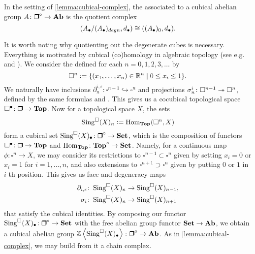 \begin{definition}
  \label{dfn:reduced-cubical-complex}
  In the setting of \ref{lemma:cubical-complex}, the
   associated to a cubical abelian group
  $A\colon \bsquare^\circ \to \categ{Ab}$ is the quotient complex
  $$(A_\bullet / (A_\bullet)_{degn}, d_\bullet) \cong ((A_\bullet)_0, d_\bullet).$$
\end{definition}

\begin{remark}
  It is worth noting why quotienting out the degenerate cubes is
  necessary. Everything is motivated by cubical (co)homology in algebraic
  topology (see e.g. \cite{GTM-56} and \cite{Eilenberg-MacLane-acyclic}).
  We consider the  defined for each $n = 0,1,2,3,\ldots$
  by
  $$\square^n \mathrel{\mathop:}= \{ (x_1,\ldots,x_n) \in \mathbb{R}^n \mid 0\le x_i \le 1 \}.$$
  We naturally have inclusions
  $\partial_n^{i,\epsilon}\colon \square^{n-1} \hookrightarrow \square^n$ and
  projections $\sigma_n^i\colon \square^{n-1} \twoheadrightarrow \square^n$, defined by the
  same formulas  and
  . This gives us a cocubical
  topological space $\square^\bullet\colon \bsquare \to \categ{Top}$. Now for a
  topological space $X$, the sets
  $$\operatorname{Sing}^\square (X)_n \mathrel{\mathop:}= \operatorname{Hom}_{\text{\bf Top}} (\square^n, X)$$
  form a cubical set
  $\Sing^\square (X)_\bullet \colon \bsquare^\circ\to \categ{Set}$, which is the
  composition of functors $\square^\bullet\colon \bsquare \to \categ{Top}$ and
  $\operatorname{Hom}_{\text{\bf Top}}\colon \text{\bf Top}^\circ \to \text{\bf Set}$. Namely, for a
  continuous map $\phi\colon \square^n \to X$, we may consider its restrictions
  to $\square^{n-1} \subset \square^n$ given by setting $x_i = 0$ or $x_i = 1$
  for $i = 1,\ldots,n$, and also extensions to $\square^{n+1} \supset \square^n$
  given by putting $0$ or $1$ in $i$-th position. This gives us face and
  degeneracy maps
  \begin{align*}
    \partial_{i,\epsilon}\colon \operatorname{Sing}^\square (X)_n & \to \operatorname{Sing}^\square (X)_{n-1},\\
    \sigma_i\colon \operatorname{Sing}^\square (X)_n & \to \operatorname{Sing}^\square (X)_{n+1}
  \end{align*}
  that satisfy the cubical identities. By composing our functor
  $\Sing^\square (X)_\bullet \colon \bsquare^\circ\to \categ{Set}$ with the free
  abelian group functor $\text{\bf Set} \to \text{\bf Ab}$, we obtain a cubical
  abelian group
  $\ZZ \left<\Sing^\square (X)_\bullet\right>\colon \bsquare^\circ\to \categ{Ab}$.
  As in \ref{lemma:cubical-complex}, we may build from it a chain complex.


\end{remark}
